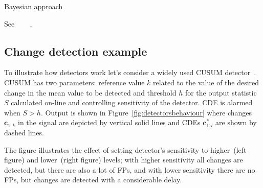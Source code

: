 Bayesian approach
~\cite{fearnhead2003line}

See~\cite{Polunchenko2011}
~\cite{WilsonBayesOnline}
~\cite{TartakovskySeq},~\cite{PolunchenkoBayesStateOfTheArt}









\subsection{Change detection example}
To illustrate how detectors work let's consider a widely used CUSUM detector~\cite{Page1954}.
CUSUM has two parameters: reference value $k$ related to the value of the desired change in the mean value to be detected and threshold $h$ for the output statistic $S$ calculated on-line and controlling sensitivity of the detector.
CDE is alarmed when $S > h$.
Output is shown in Figure~\ref{fig:detectorsbehaviour} where changes $\pmb{c}_{1:k}$ in the signal are depicted by vertical solid lines and CDEs $\pmb{c}_{1:l}^\ast$ are shown by dashed lines.

The figure illustrates the effect of setting detector's sensitivity to higher~(left figure) and lower~(right figure) levels; with higher sensitivity all changes are detected, but there are also a lot of FPs, and with lower sensitivity there are no FPs, but changes are detected with a considerable delay.


